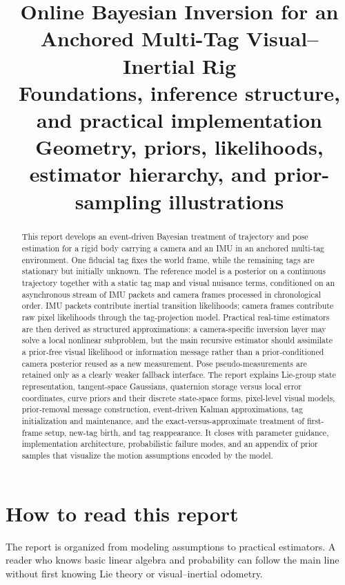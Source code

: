 \documentclass[11pt]{report}
\title{Online Bayesian Inversion for an Anchored Multi-Tag Visual--Inertial Rig\\[-1mm]\large Foundations, inference structure, and practical implementation\\[1mm]\normalsize Geometry, priors, likelihoods, estimator hierarchy, and prior-sampling illustrations}
\author{}
\date{}
\begin{document}
\hypersetup{pageanchor=false}
\maketitle
{}
\vspace{-6mm}

\begin{abstract}
This report develops an event-driven Bayesian treatment of trajectory and pose estimation for a rigid body carrying a camera and an IMU in an anchored multi-tag environment. One fiducial tag fixes the world frame, while the remaining tags are stationary but initially unknown. The reference model is a posterior on a continuous trajectory together with a static tag map and visual nuisance terms, conditioned on an asynchronous stream of IMU packets and camera frames processed in chronological order. IMU packets contribute inertial transition likelihoods; camera frames contribute raw pixel likelihoods through the tag-projection model. Practical real-time estimators are then derived as structured approximations: a camera-specific inversion layer may solve a local nonlinear subproblem, but the main recursive estimator should assimilate a prior-free visual likelihood or information message rather than a prior-conditioned camera posterior reused as a new measurement. Pose pseudo-measurements are retained only as a clearly weaker fallback interface. The report explains Lie-group state representation, tangent-space Gaussians, quaternion storage versus local error coordinates, curve priors and their discrete state-space forms, pixel-level visual models, prior-removal message construction, event-driven Kalman approximations, tag initialization and maintenance, and the exact-versus-approximate treatment of first-frame setup, new-tag birth, and tag reappearance. It closes with parameter guidance, implementation architecture, probabilistic failure modes, and an appendix of prior samples that visualize the motion assumptions encoded by the model.
\end{abstract}

\tableofcontents
\clearpage
\hypersetup{pageanchor=true}

\chapter*{How to read this report}

The report is organized from modeling assumptions to practical estimators. A reader who knows basic linear algebra and probability can follow the main line without first knowing Lie theory or visual--inertial odometry.
\end{document}
